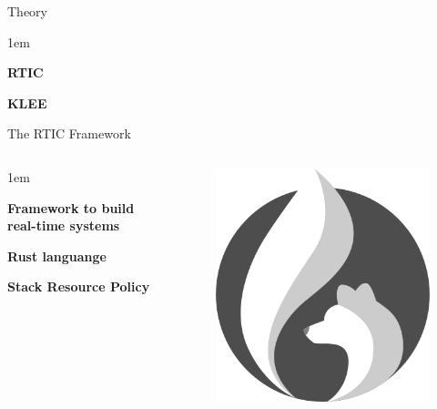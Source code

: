\begin{frame}{Theory}
    \begin{itemize-size}{1em}
        \item \textbf{RTIC}
        \item \textbf{KLEE}
    \end{itemize-size}
\end{frame}

\begin{frame}{The RTIC Framework}
    \begin{columns}
        \begin{itemize-size}{1em}
            \item \textbf{Framework to build real-time systems}
            \item \textbf{Rust languange}
            \item \textbf{Stack Resource Policy}
        \end{itemize-size}

        \begin{figure}
            \centering
            \includegraphics[scale=0.35]{pictures/RTIC.png}
        \end{figure}
    \end{columns}
\end{frame}

